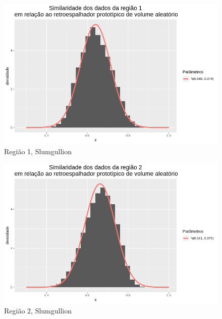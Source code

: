 \documentclass[12pt]{article}
\begin{document}
\begin{figure}[!h]
    \centering
    \vspace{0.1\linewidth}
    \includegraphics[width = \linewidth]{../../Images/Report_18_12_20/slum_rv_region1.png}
    \caption{Região 1, Slumgullion}
    \label{fig:slum_rv_r1}
\end{figure}

\begin{figure}[!h]
    \centering
    \vspace{0.1\linewidth}
    \includegraphics[width = \linewidth]{../../Images/Report_18_12_20/slum_rv_region2.png}
    \caption{Região 2, Slumgullion}
    \label{fig:slum_rv_r2}
\end{figure}
\end{document}
